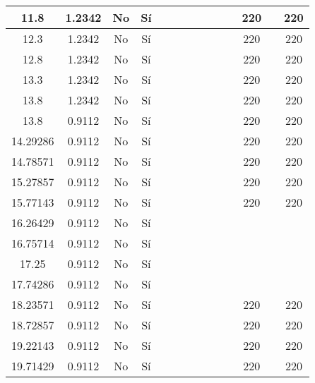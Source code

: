 \begin{table}[H]
{\begin{tabular}{|c|c|c|c|c|c|c|c|c|c|c|c|c|c|}
\hline
11.8 & 1.2342 & No  & Sí  &     &     &     &     &     &     &     & 220 &     & 220 \bigstrut\\
\hline
12.3 & 1.2342 & No  & Sí  &     &     &     &     &     &     &     & 220 &     & 220 \bigstrut\\
\hline
12.8 & 1.2342 & No  & Sí  &     &     &     &     &     &     &     & 220 &     & 220 \bigstrut\\
\hline
13.3 & 1.2342 & No  & Sí  &     &     &     &     &     &     &     & 220 &     & 220 \bigstrut\\
\hline
13.8 & 1.2342 & No  & Sí  &     &     &     &     &     &     &     & 220 &     & 220 \bigstrut\\
\hline
13.8 & 0.9112 & No  & Sí  &     &     &     &     &     &     &     & 220 &     & 220 \bigstrut\\
\hline
14.29286 & 0.9112 & No  & Sí  &     &     &     &     &     &     &     & 220 &     & 220 \bigstrut\\
\hline
14.78571 & 0.9112 & No  & Sí  &     &     &     &     &     &     &     & 220 &     & 220 \bigstrut\\
\hline
15.27857 & 0.9112 & No  & Sí  &     &     &     &     &     &     &     & 220 &     & 220 \bigstrut\\
\hline
15.77143 & 0.9112 & No  & Sí  &     &     &     &     &     &     &     & 220 &     & 220 \bigstrut\\
\hline
16.26429 & 0.9112 & No  & Sí  &     &     &     &     &     &     &     &     &     &  \bigstrut\\
\hline
16.75714 & 0.9112 & No  & Sí  &     &     &     &     &     &     &     &     &     &  \bigstrut\\
\hline
17.25 & 0.9112 & No  & Sí  &     &     &     &     &     &     &     &     &     &  \bigstrut\\
\hline
17.74286 & 0.9112 & No  & Sí  &     &     &     &     &     &     &     &     &     &  \bigstrut\\
\hline
18.23571 & 0.9112 & No  & Sí  &     &     &     &     &     &     &     & 220 &     & 220 \bigstrut\\
\hline
18.72857 & 0.9112 & No  & Sí  &     &     &     &     &     &     &     & 220 &     & 220 \bigstrut\\
\hline
19.22143 & 0.9112 & No  & Sí  &     &     &     &     &     &     &     & 220 &     & 220 \bigstrut\\
\hline
19.71429 & 0.9112 & No  & Sí  &     &     &     &     &     &     &     & 220 &     & 220 \bigstrut\\

\end{tabular}}
\end{table}
